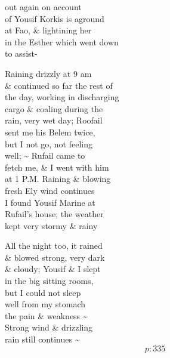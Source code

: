 \documentclass{report}
\begin{document}
	\par{
 	out again on account\ \\of Yousif Korkis is aground\ \\at Fao, \& lightining her\ \\in the Esther which went down\ \\to assist-\ \\
	}

	\par{
 	Raining drizzly at 9 am\ \\\& continued so far the rest of\ \\the day, working in discharging\ \\cargo \& coaling during the\ \\rain, very wet day; Roofail\ \\sent me his Belem twice,\ \\but I not go, not feeling\ \\well; \~{} Rufail came to\ \\fetch me, \& I went with him\ \\at 1 P.M. Raining \& blowing\ \\fresh Ely wind continues\ \\I found Yousif Marine at\ \\Rufail's house; the weather\ \\kept very stormy \& rainy\ \\
	}

	\par{
 	All the night too, it rained\ \\\& blowed strong, very dark\ \\\& cloudy; Yousif \& I slept\ \\in the big sitting rooms,\ \\but I could not sleep\ \\well from my stomach\ \\the pain \& weakness \~{}\ \\Strong wind \& drizzling\ \\rain still continues \~{}\ \\
  \[p: 335 \]

	}

\end{document}
